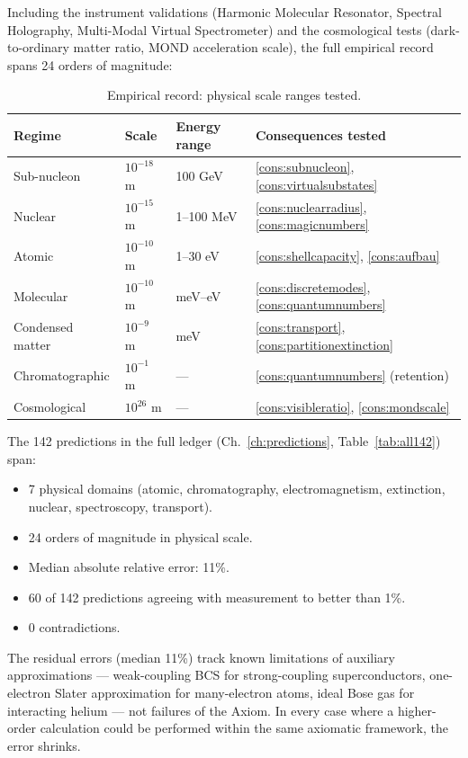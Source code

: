 Including the instrument validations (Harmonic Molecular Resonator, Spectral
Holography, Multi-Modal Virtual Spectrometer) and the cosmological tests
(dark-to-ordinary matter ratio, MOND acceleration scale), the full empirical
record spans 24 orders of magnitude:

\begin{table}[htbp]
\centering
\caption{Empirical record: physical scale ranges tested.}
\label{tab:scalerange}
\begin{tabular}{@{}llll@{}}
\toprule
Regime & Scale & Energy range & Consequences tested \\
\midrule
Sub-nucleon  & $10^{-18}$ m & 100 GeV & \ref{cons:subnucleon}, \ref{cons:virtualsubstates} \\
Nuclear      & $10^{-15}$ m & 1--100 MeV & \ref{cons:nuclearradius}, \ref{cons:magicnumbers} \\
Atomic       & $10^{-10}$ m & 1--30 eV & \ref{cons:shellcapacity}, \ref{cons:aufbau} \\
Molecular    & $10^{-10}$ m & meV--eV & \ref{cons:discretemodes}, \ref{cons:quantumnumbers} \\
Condensed matter & $10^{-9}$ m & meV & \ref{cons:transport}, \ref{cons:partitionextinction} \\
Chromatographic  & $10^{-1}$ m & --- & \ref{cons:quantumnumbers} (retention) \\
Cosmological & $10^{26}$ m & --- & \ref{cons:visibleratio}, \ref{cons:mondscale} \\
\bottomrule
\end{tabular}
\end{table}

The 142 predictions in the full ledger (Ch.~\ref{ch:predictions},
Table~\ref{tab:all142}) span:
\begin{itemize}
  \item 7 physical domains (atomic, chromatography, electromagnetism,
    extinction, nuclear, spectroscopy, transport).
  \item 24 orders of magnitude in physical scale.
  \item Median absolute relative error: 11\%.
  \item 60 of 142 predictions agreeing with measurement to better than 1\%.
  \item 0 contradictions.
\end{itemize}

The residual errors (median 11\%) track known limitations of auxiliary
approximations --- weak-coupling BCS for strong-coupling superconductors,
one-electron Slater approximation for many-electron atoms, ideal Bose gas
for interacting helium --- not failures of the Axiom.  In every case where a
higher-order calculation could be performed within the same axiomatic
framework, the error shrinks.


